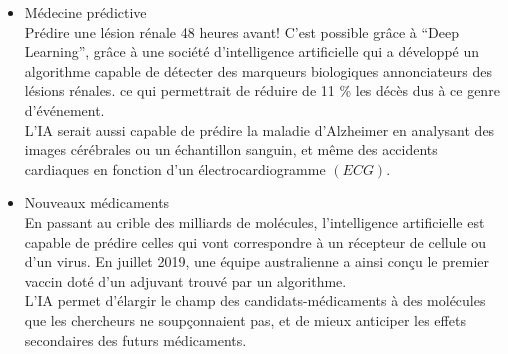\begin{itemize}
        \item Médecine prédictive\\[0.1cm]

                Prédire une lésion rénale 48 heures avant! C'est possible grâce à 
                ``Deep Learning'', grâce à une société d'intelligence artificielle qui
                a développé un algorithme capable de détecter des marqueurs
                biologiques annonciateurs des lésions rénales. ce qui permettrait de
                réduire de 11 \% les décès dus à ce genre d'événement.\\

                L'IA serait aussi capable de prédire la maladie d'Alzheimer en analysant des
                images cérébrales ou un échantillon sanguin, et même des accidents
                cardiaques en fonction d'un électrocardiogramme $(ECG)$. \\[0.25cm]

        \item Nouveaux médicaments\\[0.1cm]

            En passant au crible des milliards de molécules, l'intelligence
            artificielle est capable de prédire celles qui vont correspondre à un
            récepteur de cellule ou d'un virus.
            En juillet 2019, une équipe
            australienne a ainsi conçu le premier vaccin doté d'un adjuvant trouvé
            par un algorithme.\\

            L'IA permet d'élargir le champ des
            candidats-médicaments à des molécules que les chercheurs ne
            soupçonnaient pas, et de mieux anticiper les effets secondaires des
            futurs médicaments. \mybox


\end{itemize}

